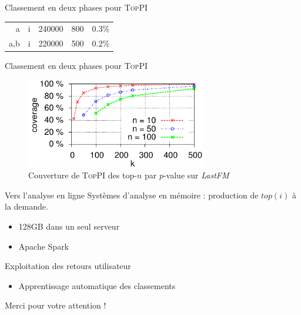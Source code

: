 \documentclass[table]{beamer}
\providecommand{\toppi}{\mbox{\textsc{TopPI}}}
\begin{document}
\begin{frame}[t]{Classement en deux phases pour \toppi}
{\begin{table}
\begin{tabular}{|rl|c|c|c|}
        {a} & i     &  240000 &  800  &  $0.3\%$\\
        {a,b} & i & 220000 &  500  & $0.2\%$\\
        \hline
    \end{tabular}
  \end{table}
  }
\end{frame}

\begin{frame}{Classement en deux phases pour \toppi}
  \begin{figure}
    \centering
    \includegraphics[width=0.7\textwidth]{../fig/toppi/top-Correlatedcoverage/lastfm.pdf}\\
      Couverture de \toppi{} des top-$n$ par $p$-value sur {\em LastFM}
  \end{figure}
\end{frame}

\begin{frame}{Vers l'analyse en ligne}
  Systèmes d'analyse en mémoire : production de $\mathit{top}(i)$ à la demande.
  \begin{itemize}
    \item 128GB dans un seul serveur
    \item Apache Spark
  \end{itemize}
  \vspace{1em}
  Exploitation des retours utilisateur
  \begin{itemize}
    \item Apprentissage automatique des classements
  \end{itemize}

\end{frame}


\begin{frame}[plain]
	Merci pour votre attention !
\end{frame}
\end{document}

